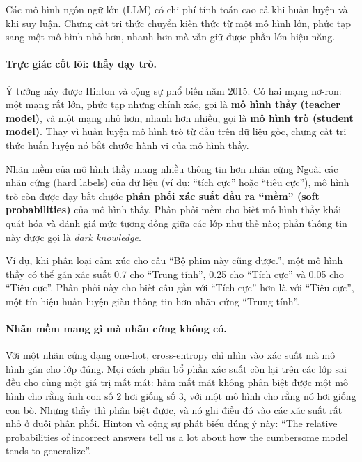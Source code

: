Các mô hình ngôn ngữ lớn (LLM) có chi phí tính toán cao cả khi huấn luyện và khi suy luận. Chưng cất tri thức chuyển kiến thức từ một mô hình lớn, phức tạp sang một mô hình nhỏ hơn, nhanh hơn mà vẫn giữ được phần lớn hiệu năng.

\paragraph{Trực giác cốt lõi: thầy dạy trò.}
Ý tưởng này được Hinton và cộng sự \cite{hinton2015distilling} phổ biến năm 2015. Có hai mạng nơ-ron: một mạng rất lớn, phức tạp nhưng chính xác, gọi là \textbf{mô hình thầy (teacher model)}, và một mạng nhỏ hơn, nhanh hơn nhiều, gọi là \textbf{mô hình trò (student model)}. Thay vì huấn luyện mô hình trò từ đầu trên dữ liệu gốc, chưng cất tri thức huấn luyện nó bắt chước hành vi của mô hình thầy.

\begin{keyidea}{Nhãn mềm của mô hình thầy mang nhiều thông tin hơn nhãn cứng}
	Ngoài các nhãn cứng (hard labels) của dữ liệu (ví dụ: “tích cực” hoặc “tiêu cực”), mô hình trò còn được dạy bắt chước \textbf{phân phối xác suất đầu ra “mềm” (soft probabilities)} của mô hình thầy. Phân phối mềm cho biết mô hình thầy khái quát hóa và đánh giá mức tương đồng giữa các lớp như thế nào; phần thông tin này được gọi là \emph{dark knowledge}.
\end{keyidea}

Ví dụ, khi phân loại cảm xúc cho câu “Bộ phim này cũng được.”, một mô hình thầy có thể gán xác suất 0.7 cho “Trung tính”, 0.25 cho “Tích cực” và 0.05 cho “Tiêu cực”. Phân phối này cho biết câu gần với “Tích cực” hơn là với “Tiêu cực”, một tín hiệu huấn luyện giàu thông tin hơn nhãn cứng “Trung tính”.

\paragraph{Nhãn mềm mang gì mà nhãn cứng không có.}
Với một nhãn cứng dạng one-hot, cross-entropy chỉ nhìn vào xác suất mà mô hình gán cho lớp đúng. Mọi cách phân bổ phần xác suất còn lại trên các lớp sai đều cho cùng một giá trị mất mát: hàm mất mát không phân biệt được một mô hình cho rằng ảnh con số 2 hơi giống số 3, với một mô hình cho rằng nó hơi giống con bò. Nhưng thầy thì phân biệt được, và nó ghi điều đó vào các xác suất rất nhỏ ở đuôi phân phối. Hinton và cộng sự \cite{hinton2015distilling} phát biểu đúng ý này: ``The relative probabilities of incorrect answers tell us a lot about how the cumbersome model tends to generalize''.

